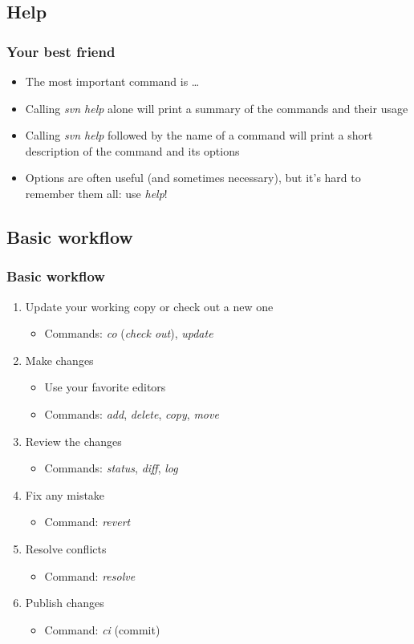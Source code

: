 \documentclass{beamer}
\begin{document}
\subsection{Help}

\frame
{
  \frametitle{Your best friend}
  
  \begin{itemize}
  \item<1-> The most important command is \dots
  		  \uncover<2->{\textit{help}}
  \item<3-> Calling \textit{svn help} alone will print a summary of the commands and their usage
  \item<4-> Calling \textit{svn help} followed by the name of a command will print a short description of the command and its options
  \item<5-> Options are often useful (and sometimes necessary), but it's hard to remember them all: use \textit{help}!
  \end{itemize}

}

\subsection{Basic workflow}

\frame
{
  \frametitle{Basic workflow}
  
  \begin{enumerate}
  \item<1-> Update your working copy or check out a new one
  	\begin{itemize}
  	\item<1-> Commands: \textit{co} (\textit{check out}), \textit{update}
  	\end{itemize}
  \item<2-> Make changes
  	\begin{itemize}
	\item<2-> Use your favorite editors
	\item<2-> Commands: \textit{add}, \textit{delete}, \textit{copy}, \textit{move}
	\end{itemize}
  \item<3-> Review the changes
  	\begin{itemize}
	\item<3-> Commands: \textit{status}, \textit{diff}, \textit{log}
	\end{itemize}
  \item<4-> Fix any mistake
  	\begin{itemize}
	\item<4-> Command: \textit{revert}
	\end{itemize}
  \item<5-> Resolve conflicts
  	\begin{itemize}
	\item<4-> Command: \textit{resolve}
	\end{itemize}
  \item<6-> Publish changes
  	\begin{itemize}
	\item<4-> Command: \textit{ci} (commit)
	\end{itemize}
  \end{enumerate}

}
\end{document}
